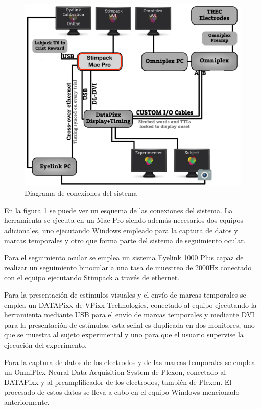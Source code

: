 \documentclass[conference]{IEEEtran}
\begin{document}
\begin{figure}[htbp]
\centerline{\includegraphics[width=\linewidth]{figures/system_diagram.png}}
\caption{Diagrama de conexiones del sistema}
\label{figSysDiagram}
\end{figure}
En la figura \ref{figSysDiagram} se puede ver un esquema de las conexiones del sistema. La herramienta se ejecuta en un Mac Pro siendo además necesarios dos equipos adicionales, uno ejecutando Windows empleado para la captura de datos y marcas temporales y otro que forma parte del sistema de seguimiento ocular.

Para el seguimiento ocular se emplea un sistema Eyelink 1000 Plus\cite{eyelink} capaz de realizar un seguimiento binocular a una tasa de muestreo de 2000Hz conectado con el equipo ejecutando Stimpack a través de ethernet.

Para la presentación de estímulos visuales y el envío de marcas temporales se emplea un DATAPixx \cite{datapixx} de VPixx Technologies, conectado al equipo ejecutando la herramienta mediante USB para el envío de marcas temporales y mediante DVI para la presentación de estímulos, esta señal es duplicada en dos monitores, uno que se muestra al sujeto experimental y uno para que el usuario supervise la ejecución del experimento.

Para la captura de datos de los electrodos y de las marcas temporales se emplea un OmniPlex Neural Data Acquisition System\cite{omniplex} de Plexon, conectado al DATAPixx y al preamplificador de los electrodos, también de Plexon. El procesado de estos datos se lleva a cabo en el equipo Windows mencionado anteriormente.
\end{document}
